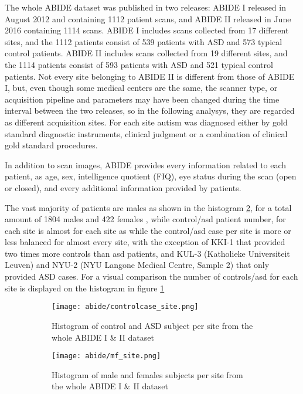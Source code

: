\documentclass[12pt]{report}
\begin{document}
The whole ABIDE dataset was published in two releases: ABIDE I released in August 2012 and containing 1112 patient scans, and ABIDE II released in June 2016 containing 1114 scans.
ABIDE I includes scans collected from 17 different sites, and the 1112 patients consist of 539 patients with ASD and 573 typical control patients.
ABIDE II includes scans collected from 19 different sites, and the 1114 patients consist of 593 patients with ASD and 521 typical control patients.
Not every site belonging to ABIDE II is different from those of ABIDE I, but, even though some medical centers are the same, the scanner type, or acquisition pipeline and parameters may have been changed during the time interval between the two releases, so in the following analysys, they are regarded as different acquisition sites.
For each site autism was diagnosed either by gold standard diagnostic instruments, clinical judgment or a combination of clinical gold standard procedures.

In addition to scan images, ABIDE provides every information related to each patient, as age, sex, intelligence quotient (FIQ), eye status during the scan (open or closed), and every additional information provided by patients.

The vast majority of patients are males as shown in the histogram \ref{fig:mf_site}, for a total amount of 1804 males and 422 females , while control/asd patient number, for each site is almost  for each site as
while the control/asd case per site is more or less balanced for almost every site, with the exception of KKI-1 that provided two times more controls than asd patients, and KUL-3 (Katholieke Universiteit Leuven) and NYU-2 (NYU Langone Medical Centre, Sample 2) that only provided ASD cases. For a visual comparison the number of controls/asd for each site is displayed on the histogram in figure \ref{fig:controlcase_site}

\begin{figure}[h]
\centering
\begin{subfigure}{0.9\textwidth}
\texttt{[image: abide/controlcase\_site.png]}
\caption{Histogram of control and ASD subject per site from the whole ABIDE I \& II dataset}
\label{fig:controlcase_site}
\end{subfigure}
\begin{subfigure}{0.9\textwidth}
\texttt{[image: abide/mf\_site.png]}
\caption{Histogram of male and females subjects per site from the whole ABIDE I \& II dataset}
\label{fig:mf_site}
\end{subfigure}
\caption{}
\label{}
\end{figure}
\end{document}
